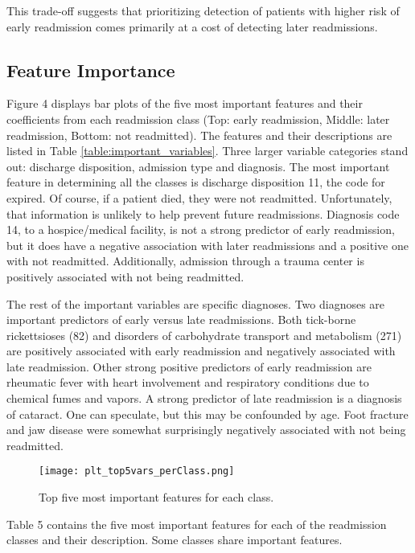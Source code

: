 \documentclass{article}      %
\begin{document}
This trade-off suggests that prioritizing detection of patients with higher risk of early readmission comes primarily at a cost of detecting later readmissions. 

\subsection{Feature Importance}

Figure 4 displays bar plots of the five most important features and their coefficients from each readmission class (Top: early readmission, Middle: later readmission, Bottom: not readmitted). The features and their descriptions are listed in Table \ref{table:important_variables}. Three larger variable categories stand out: discharge disposition, admission type and diagnosis. The most important feature in determining all the classes is discharge disposition 11, the code for expired. Of course, if a patient died, they were not readmitted. Unfortunately, that information is unlikely to help prevent future readmissions. Diagnosis code 14, to a hospice/medical facility, is not a strong predictor of early readmission, but it does have a negative association with later readmissions and a positive one with not readmitted. Additionally, admission through a trauma center is positively associated with not being readmitted. 

The rest of the important variables are specific diagnoses. Two diagnoses are important predictors of early versus late readmissions. Both tick-borne rickettsioses (82) and disorders of carbohydrate transport and metabolism (271) are positively associated with early readmission and negatively associated with late readmission. Other strong positive predictors of early readmission are rheumatic fever with heart involvement and respiratory conditions due to chemical fumes and vapors. A strong predictor of late readmission is a diagnosis of cataract. One can speculate, but this may be confounded by age. Foot fracture and jaw disease were somewhat surprisingly negatively associated with not being readmitted. 

\begin{figure}[h]
    \centering
    \texttt{[image: plt\_top5vars\_perClass.png]}
    \caption{Top five most important features for each class.}
    \label{fig:Top5Vars_perClass}
\end{figure}

\FloatBarrier
Table 5 contains the five most important features for each of the readmission classes and their description. Some classes share important features.
\end{document}
